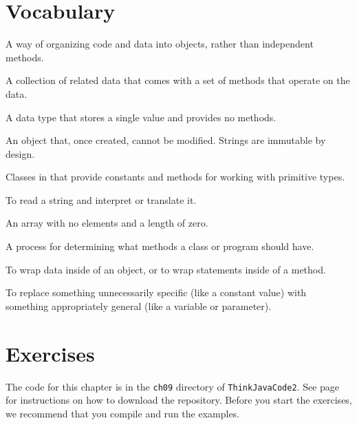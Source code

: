 

\section{Vocabulary}

\begin{description}

A way of organizing code and data into objects, rather than independent methods.

A collection of related data that comes with a set of methods that operate on the data.

A data type that stores a single value and provides no methods.

An object that, once created, cannot be modified.
Strings are immutable by design.

Classes in  that provide constants and methods for working with primitive types.

To read a string and interpret or translate it.

An array with no elements and a length of zero.

A process for determining what methods a class or program should have.

To wrap data inside of an object, or to wrap statements inside of a method.

To replace something unnecessarily specific (like a constant value) with something appropriately general (like a variable or parameter).

\end{description}


\section{Exercises}

The code for this chapter is in the {\tt ch09} directory of {\tt ThinkJavaCode2}.
See page~\pageref{code} for instructions on how to download the repository.
Before you start the exercises, we recommend that you compile and run the examples.


